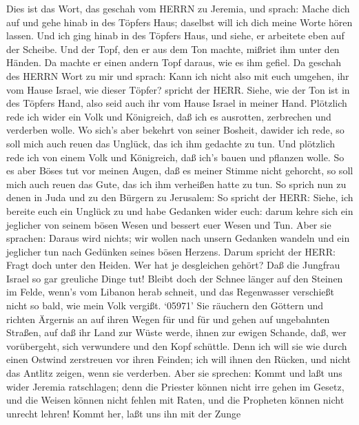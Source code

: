  Dies ist das Wort, das geschah vom HERRN zu Jeremia, und
sprach:  Mache dich auf und gehe hinab in des Töpfers Haus;
daselbst will ich dich meine Worte hören lassen.  Und ich
ging hinab in des Töpfers Haus, und siehe, er arbeitete eben auf der
Scheibe.  Und der Topf, den er aus dem Ton machte, mißriet
ihm unter den Händen. Da machte er einen andern Topf daraus, wie es ihm
gefiel.  Da geschah des HERRN Wort zu mir und sprach:
 Kann ich nicht also mit euch umgehen, ihr vom Hause Israel,
wie dieser Töpfer? spricht der HERR. Siehe, wie der Ton ist in des
Töpfers Hand, also seid auch ihr vom Hause Israel in meiner Hand.
 Plötzlich rede ich wider ein Volk und Königreich, daß ich
es ausrotten, zerbrechen und verderben wolle.  Wo sich's
aber bekehrt von seiner Bosheit, dawider ich rede, so soll mich auch
reuen das Unglück, das ich ihm gedachte zu tun.  Und
plötzlich rede ich von einem Volk und Königreich, daß ich's bauen und
pflanzen wolle.  So es aber Böses tut vor meinen Augen, daß
es meiner Stimme nicht gehorcht, so soll mich auch reuen das Gute, das
ich ihm verheißen hatte zu tun.  So sprich nun zu denen in
Juda und zu den Bürgern zu Jerusalem: So spricht der HERR: Siehe, ich
bereite euch ein Unglück zu und habe Gedanken wider euch: darum kehre
sich ein jeglicher von seinem bösen Wesen und bessert euer Wesen und
Tun.  Aber sie sprachen: Daraus wird nichts; wir wollen
nach unsern Gedanken wandeln und ein jeglicher tun nach Gedünken seines
bösen Herzens.  Darum spricht der HERR: Fragt doch unter
den Heiden. Wer hat je desgleichen gehört? Daß die Jungfrau Israel so
gar greuliche Dinge tut!  Bleibt doch der Schnee länger auf
den Steinen im Felde, wenn's vom Libanon herab schneit, und das
Regenwasser verschießt nicht so bald, wie mein Volk vergißt.
 `05971' Sie räuchern den Göttern und richten Ärgernis an
auf ihren Wegen für und für und gehen auf ungebahnten Straßen,
 auf daß ihr Land zur Wüste werde, ihnen zur ewigen
Schande, daß, wer vorübergeht, sich verwundere und den Kopf schüttle.
 Denn ich will sie wie durch einen Ostwind zerstreuen vor
ihren Feinden; ich will ihnen den Rücken, und nicht das Antlitz zeigen,
wenn sie verderben.  Aber sie sprechen: Kommt und laßt uns
wider Jeremia ratschlagen; denn die Priester können nicht irre gehen im
Gesetz, und die Weisen können nicht fehlen mit Raten, und die Propheten
können nicht unrecht lehren! Kommt her, laßt uns ihn mit der Zunge

